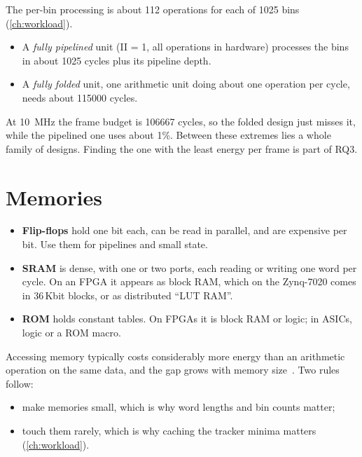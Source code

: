 \begin{whybox}
The per-bin processing is about 112 operations for each of 1025 bins
(\cref{ch:workload}).
\begin{itemize}
  \item A \emph{fully pipelined} unit (II = 1, all operations in hardware)
        processes the bins in about \num{1025} cycles plus its pipeline depth.
  \item A \emph{fully folded} unit, one arithmetic unit doing about one
        operation per cycle, needs about \num{115000} cycles.
\end{itemize}
At \qty{10}{\MHz} the frame budget is \num{106667} cycles, so the folded design
just misses it, while the pipelined one uses about 1\%. Between these extremes
lies a whole family of designs. Finding the one with the least energy per frame
is part of RQ3.
\end{whybox}

\section{Memories}\label{sec:primer:memory}

\begin{itemize}
  \item \textbf{Flip-flops} hold one bit each, can be read in parallel, and are
        expensive per bit. Use them for pipelines and small state.
  \item \textbf{SRAM} is dense, with one or two ports, each reading or writing
        one word per cycle. On an FPGA it appears as block RAM, which on the
        Zynq-7020 comes in 36\,Kbit blocks, or as distributed \enquote{LUT RAM}.
  \item \textbf{ROM} holds constant tables. On FPGAs it is block RAM or logic;
        in ASICs, logic or a ROM macro.
\end{itemize}
Accessing memory typically costs considerably more energy than an arithmetic
operation on the same data, and the gap grows with memory
size~\cite{ch12-13:horowitz2014energy}. Two rules follow:
\begin{itemize}
  \item make memories small, which is why word lengths and bin counts matter;
  \item touch them rarely, which is why caching the tracker minima matters
        (\cref{ch:workload}).
\end{itemize}

